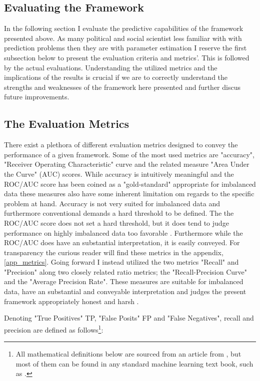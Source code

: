 \documentclass[a4paper]{article}
\begin{document}
\subsection{Evaluating the Framework}
In the following section I evaluate the predictive capabilities of the framework presented above. As many political and social scientist less familiar with with prediction problems then they are with parameter estimation I reserve the first subsection below to present the evaluation criteria and metrics'. This is followed by the actual evaluations. Understanding the utilized metrics and the implications of the results is crucial if we are to correctly understand the strengths and weaknesses of the framework here presented and further discus future improvements.\par

\subsection{The Evaluation Metrics}

There exist a plethora of different evaluation metrics designed to convey the performance of a given framework. Some of the most used metrics are "accuracy", "Receiver Operating Characteristic" curve and the related measure "Area Under the Curve" (AUC) scores. While accuracy is intuitively meaningful and the ROC/AUC score has been coined as a "gold-standard" \citep[366]{perry_2013} appropriate for imbalanced data\citep[1277-1278]{He_2008} these measures also have some inherent limitation om regards to the specific problem at hand. Accuracy is not very suited for imbalanced data \citep[1264]{He_2008} and furthermore conventional demands a hard threshold to be defined. The the ROC/AUC score does not set a hard threshold, but it does tend to judge performance on highly imbalanced data too favorable \citep[1278]{He_2008}. Furthermore while the ROC/AUC does have an substantial interpretation, it is easily conveyed. For transparency the curious reader will find these metrics in the appendix, \autoref{app_metrics}. Going forward I instead utilized the two metrics "Recall" and "Precision" along two closely related ratio metrics; the "Recall-Precision Curve" and the "Average Precision Rate". These measures are suitable for imbalanced data, have an substantial and conveyable interpretation and judges the present framework appropriately honest and harsh \cite[1278]{He_2008}.

Denoting "True Positives" TP, "False Posits" FP and "False Negatives", recall and precision are defined as follows\footnote{All mathematical definitions below are sourced from an article from \cite{He_2008}, but most of them can be found in any standard machine learning text book, such as \cite{Friedman_2001}.}:
\end{document}
